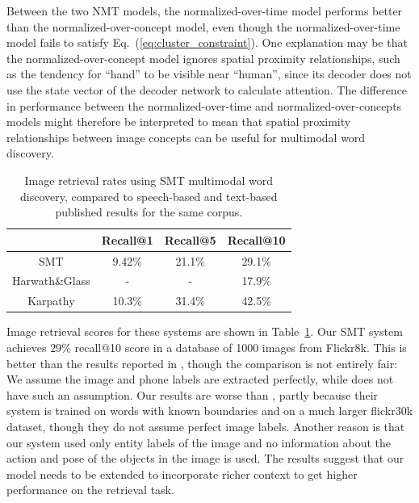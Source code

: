 \documentclass[a4paper]{article}
\begin{document}
Between the two NMT models, the normalized-over-time model performs better than the normalized-over-concept model,
even though the normalized-over-time model fails to satisfy Eq.~(\ref{eq:cluster_constraint}).  
One explanation may be that the normalized-over-concept model ignores
spatial proximity relationships,
such as the tendency for ``hand'' to be visible near ``human'',
since its decoder does not
use the state vector of the decoder network to calculate attention.
The difference in performance between the normalized-over-time and normalized-over-concepts models might therefore be interpreted to mean that spatial proximity relationships between image concepts can be useful for multimodal word discovery.

\begin{table}[th]
    \centering
    \caption{Image retrieval rates using SMT multimodal word discovery, compared to speech-based and text-based published results for the same corpus.}
    \begin{tabular}{|c|c|c|c|}
    \hline
             & Recall@1 & Recall@5 & Recall@10\\
             \hline
             SMT & 9.42\% & 21.1\% & 29.1\% \\
         Harwath\&Glass \cite{Harwath15} & - & - & 17.9\% \\
         Karpathy \cite{Karpathy14} &10.3\% &31.4\% & 42.5\%\\
         \hline
    \end{tabular}
    \label{tab:retrieval_res}
\end{table}

Image retrieval scores for these systems are shown in Table~\ref{tab:retrieval_res}.
Our SMT system achieves $29 \%$ recall@10 score in a database of 1000 images from Flickr8k.
This is better than the results reported in \cite{Harwath15}, though the comparison is not entirely fair:
We assume the image and phone labels are extracted perfectly, while \cite{Harwath15} does not have such an assumption. Our results are worse than \cite{Karpathy14}, partly because their system is trained on words with known boundaries and on a much larger flickr30k dataset, though they do not assume perfect image labels. Another reason is that our system used only entity labels of the image and no information about the action and pose of the objects in the image is used. The results suggest that our model needs to be extended to incorporate richer context to get higher performance on the retrieval task.
\end{document}
